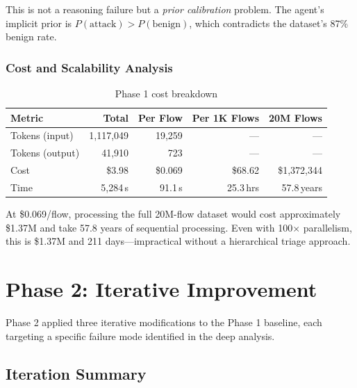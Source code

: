 \documentclass[12pt, a4paper, oneside]{report}
\begin{document}
This is not a reasoning failure but a \emph{prior calibration} problem. The
agent's implicit prior is $P(\text{attack}) > P(\text{benign})$, which contradicts
the dataset's 87\% benign rate.

\subsection{Cost and Scalability Analysis}

\begin{table}[H]
\centering
\caption{Phase 1 cost breakdown}
\label{tab:phase1-cost}
\begin{tabular}{@{}lrrrr@{}}
\toprule
\textbf{Metric} & \textbf{Total} & \textbf{Per Flow} & \textbf{Per 1K Flows} & \textbf{20M Flows} \\
\midrule
Tokens (input)   & 1{,}117{,}049 & 19{,}259 & --- & --- \\
Tokens (output)  & 41{,}910      & 723     & --- & --- \\
Cost             & \$3.98        & \$0.069 & \$68.62 & \$1{,}372{,}344 \\
Time             & 5{,}284\,s    & 91.1\,s & 25.3\,hrs & 57.8\,years \\
\bottomrule
\end{tabular}
\end{table}

At \$0.069/flow, processing the full 20M-flow dataset would cost approximately
\$1.37M and take 57.8 years of sequential processing. Even with 100$\times$
parallelism, this is \$1.37M and 211 days---impractical without a hierarchical
triage approach.


\chapter{Phase 2: Iterative Improvement}
\label{ch:phase2-analysis}

Phase 2 applied three iterative modifications to the Phase 1 baseline, each
targeting a specific failure mode identified in the deep analysis.

\section{Iteration Summary}
\end{document}
